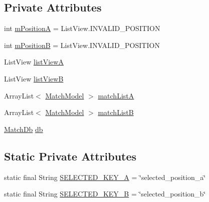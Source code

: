 \subsection*{Private Attributes}
\begin{DoxyCompactItemize}
\item 
int \hyperlink{classorg_1_1buildmlearn_1_1matchtemplate_1_1fragment_1_1DetailActivityFragment_a81054ea2bbc56cfcf9f10a3f989decfb}{m\+PositionA} = List\+View.\+I\+N\+V\+A\+L\+I\+D\+\_\+\+P\+O\+S\+I\+T\+I\+ON
\item 
int \hyperlink{classorg_1_1buildmlearn_1_1matchtemplate_1_1fragment_1_1DetailActivityFragment_a38fbaf6942a347066e94dd2db93b7fde}{m\+PositionB} = List\+View.\+I\+N\+V\+A\+L\+I\+D\+\_\+\+P\+O\+S\+I\+T\+I\+ON
\item 
List\+View \hyperlink{classorg_1_1buildmlearn_1_1matchtemplate_1_1fragment_1_1DetailActivityFragment_ad91c65f09a0b4bf50cd342c6c90a5ea2}{list\+ViewA}
\item 
List\+View \hyperlink{classorg_1_1buildmlearn_1_1matchtemplate_1_1fragment_1_1DetailActivityFragment_a05410afc2abf065344b1a93233958dd1}{list\+ViewB}
\item 
Array\+List$<$ \hyperlink{classorg_1_1buildmlearn_1_1matchtemplate_1_1data_1_1MatchModel}{Match\+Model} $>$ \hyperlink{classorg_1_1buildmlearn_1_1matchtemplate_1_1fragment_1_1DetailActivityFragment_aaa749518df6deb5274bc1a3b9df9db8f}{match\+ListA}
\item 
Array\+List$<$ \hyperlink{classorg_1_1buildmlearn_1_1matchtemplate_1_1data_1_1MatchModel}{Match\+Model} $>$ \hyperlink{classorg_1_1buildmlearn_1_1matchtemplate_1_1fragment_1_1DetailActivityFragment_adab1e2b56b477716d429569e54e446cf}{match\+ListB}
\item 
\hyperlink{classorg_1_1buildmlearn_1_1matchtemplate_1_1data_1_1MatchDb}{Match\+Db} \hyperlink{classorg_1_1buildmlearn_1_1matchtemplate_1_1fragment_1_1DetailActivityFragment_af31e0f919a0b156b9cfa95e7b46cf5a7}{db}
\end{DoxyCompactItemize}
\subsection*{Static Private Attributes}
\begin{DoxyCompactItemize}
\item 
static final String \hyperlink{classorg_1_1buildmlearn_1_1matchtemplate_1_1fragment_1_1DetailActivityFragment_abf22cb750a8dc8b3ac100d59f7c95546}{S\+E\+L\+E\+C\+T\+E\+D\+\_\+\+K\+E\+Y\+\_\+A} = \char`\"{}selected\+\_\+position\+\_\+a\char`\"{}
\item 
static final String \hyperlink{classorg_1_1buildmlearn_1_1matchtemplate_1_1fragment_1_1DetailActivityFragment_adf0c07a60092da7144fc865c581e99b2}{S\+E\+L\+E\+C\+T\+E\+D\+\_\+\+K\+E\+Y\+\_\+B} = \char`\"{}selected\+\_\+position\+\_\+b\char`\"{}
\end{DoxyCompactItemize}


